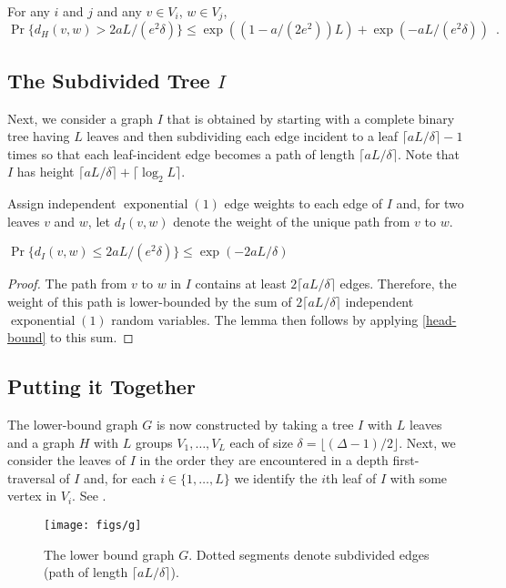 \documentclass[lotsofwhite]{patmorin}
\DeclareMathOperator{\exponential}{exponential}
\begin{document}
\begin{cor}
  For any $i$ and $j$ and any $v\in V_i$, $w\in V_j$, 
  \[
    \Pr\{d_H(v,w) > 2aL/(e^2\delta)\} 
        \le \exp((1-a/(2e^2))L) + \exp(-aL/(e^2\delta)) \enspace . 
  \]
\end{cor}

\subsection{The Subdivided Tree $I$}

Next, we consider a graph $I$ that is obtained by starting with a complete
binary tree having $L$ leaves and then subdividing each edge incident
to a leaf $\lceil aL/\delta\rceil-1$ times so that each leaf-incident
edge becomes a path of length $\lceil aL/\delta\rceil$.  Note that $I$
has height $\lceil aL/\delta\rceil+\lceil\log_2 L\rceil$.

Assign independent $\exponential(1)$ edge weights to each edge of $I$
and, for two leaves $v$ and $w$, let $d_I(v,w)$ denote the weight of
the unique path from $v$ to $w$.

\begin{lem}
   $\Pr\{d_I(v,w) \le 2aL/(e^2\delta)\} \le \exp(-2aL/\delta)$
\end{lem}

\begin{proof}
  The path from $v$ to $w$ in $I$ contains at least $2\lceil
  aL/\delta\rceil$ edges.  Therefore, the weight of this path is
  lower-bounded by the sum of $2\lceil aL/\delta\rceil$ independent
  $\exponential(1)$ random variables.  The lemma then follows by applying
  \eqref{head-bound} to this sum.
\end{proof}


\subsection{Putting it Together}

The lower-bound graph $G$ is now constructed by taking a tree $I$ with
$L$ leaves and a graph $H$ with $L$ groups $V_1,\ldots,V_L$ each of size
$\delta=\lfloor(\Delta-1)/2\rfloor$.  Next, we consider the leaves of
$I$ in the order they are encountered in a depth first-traversal of $I$
and, for each $i\in\{1,\ldots,L\}$ we identify the $i$th leaf of $I$
with some vertex in $V_i$.  See .

\begin{figure}
  \begin{center}
    \texttt{[image: figs/g]}
  \end{center}
  \caption{The lower bound graph $G$. Dotted segments denote subdivided edges (path of length $\lceil aL/\delta\rceil$).}
\end{figure}
\end{document}
